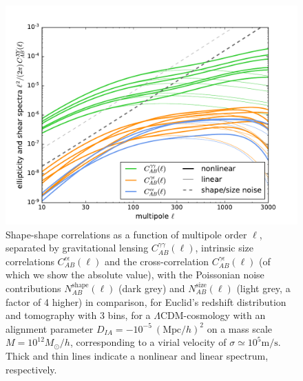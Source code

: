\documentclass[a4paper,fleqn,usenatbib]{mnras}
\begin{document}
\begin{figure}
\centering
\includegraphics[scale=0.45]{./figures/ia_spectrum.pdf}
\caption{Shape-shape correlations as a function of multipole order $\ell$, separated by gravitational lensing $C_{AB}^{\gamma\gamma}(\ell)$, intrinsic size correlations $C_{AB}^{\epsilon\epsilon}(\ell)$ and the cross-correlation $C_{AB}^{\gamma\epsilon}(\ell)$ (of which we show the absolute value), with the Poissonian noise contributions $N_{AB}^\mathrm{shape}(\ell)$ (dark grey) and $N_{AB}^\mathrm{size}(\ell)$ (light grey, a factor of 4 higher) in comparison, for Euclid's redshift distribution and tomography with 3 bins, for a $\Lambda$CDM-cosmology with an alignment parameter $D_{IA}=-10^{-5}~(\mathrm{Mpc}/h)^2$ on a mass scale $M = 10^{12}M_\odot/h$, corresponding to a virial velocity of $\sigma\simeq10^5\mathrm{m}/\mathrm{s}$. Thick and thin lines indicate a nonlinear and linear spectrum, respectively.}
\label{fig:shapeshape}
\end{figure}
\end{document}
